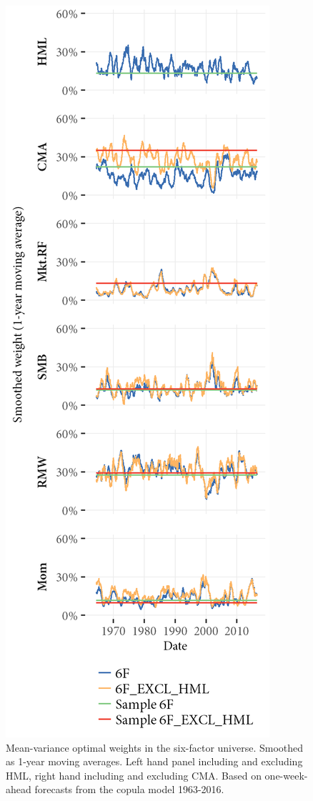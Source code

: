 \begin{figure}[htbp]
  \centering
  \footnotesize
  \renewcommand{\arraystretch}{1.2}
  \caption{Mean-variance optimal weights in the six-factor universe. Smoothed as 1-year moving averages. Left hand panel including and excluding HML, right hand including and excluding CMA. Based on one-week-ahead forecasts from the copula model 1963-2016.}
  \label{fig:mv_optimal_6}
  \includegraphics[scale = 1]{graphics/Weights_6F_EXCL_HML_6F.png}

\end{figure}
